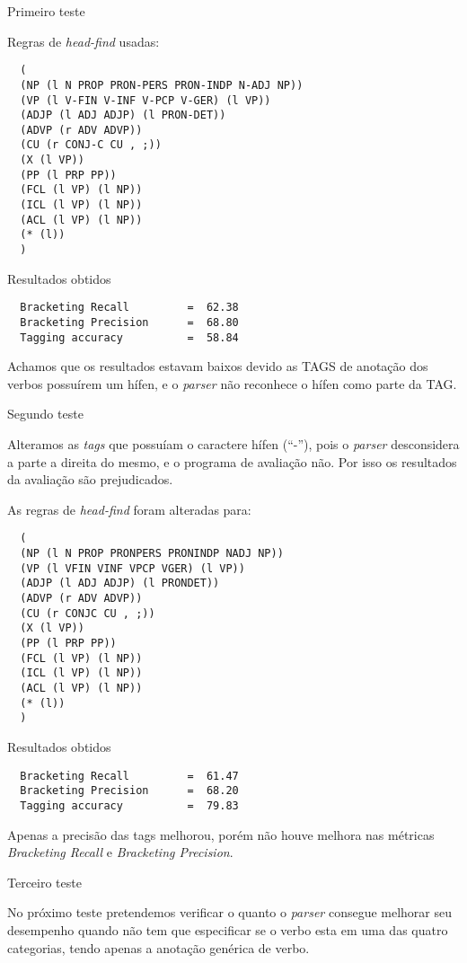 
Primeiro teste

Regras de \emph{head-find} usadas:

\scriptsize
\begin{verbatim}
  (
  (NP (l N PROP PRON-PERS PRON-INDP N-ADJ NP))
  (VP (l V-FIN V-INF V-PCP V-GER) (l VP))
  (ADJP (l ADJ ADJP) (l PRON-DET))
  (ADVP (r ADV ADVP))
  (CU (r CONJ-C CU , ;))
  (X (l VP))
  (PP (l PRP PP))
  (FCL (l VP) (l NP))
  (ICL (l VP) (l NP))
  (ACL (l VP) (l NP))
  (* (l))
  )
\end{verbatim}

Resultados obtidos

\begin{verbatim}
  Bracketing Recall         =  62.38
  Bracketing Precision      =  68.80
  Tagging accuracy          =  58.84
\end{verbatim}

\normalsize
Achamos que os resultados estavam baixos devido as TAGS de anotação dos verbos possuírem um hífen, e o \emph{parser} não reconhece o hífen como parte da TAG.

Segundo teste

Alteramos as \emph{tags} que possuíam o caractere hífen (``-''), pois o \emph{parser} desconsidera a parte a direita do mesmo, e o programa de avaliação não. Por isso os resultados da avaliação são prejudicados.

As regras de \emph{head-find} foram alteradas para:

\scriptsize
\begin{verbatim}
  (
  (NP (l N PROP PRONPERS PRONINDP NADJ NP))
  (VP (l VFIN VINF VPCP VGER) (l VP))
  (ADJP (l ADJ ADJP) (l PRONDET))
  (ADVP (r ADV ADVP))
  (CU (r CONJC CU , ;))
  (X (l VP))
  (PP (l PRP PP))
  (FCL (l VP) (l NP))
  (ICL (l VP) (l NP))
  (ACL (l VP) (l NP))
  (* (l))
  )
\end{verbatim}

Resultados obtidos

\begin{verbatim}
  Bracketing Recall         =  61.47
  Bracketing Precision      =  68.20
  Tagging accuracy          =  79.83
\end{verbatim}

\normalsize
Apenas a precisão das tags melhorou, porém não houve melhora nas métricas \emph{Bracketing Recall} e \emph{Bracketing Precision}.

Terceiro teste

No próximo teste pretendemos verificar o quanto o \emph{parser} consegue melhorar seu desempenho quando não tem que especificar se o verbo esta em uma das quatro categorias, tendo apenas a anotação genérica de verbo.

